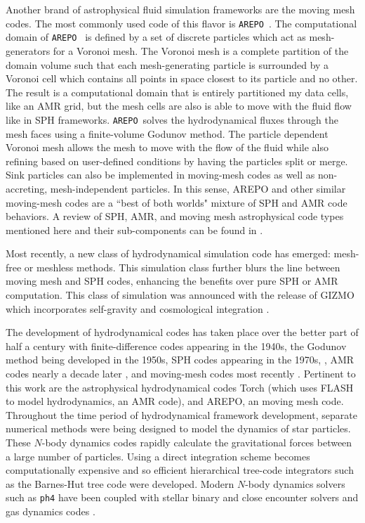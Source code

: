 \documentclass[twoside]{drexel-thesis}
\newcommand\arepo{\texttt{AREPO}}
\begin{document}
\begin{thesis}
Another brand of astrophysical fluid simulation frameworks are the moving mesh codes. The most commonly used code of this flavor is \arepo~\citep{springel_e_2010}. The computational domain of \arepo~ is defined by a set of discrete particles which act as mesh-generators for a Voronoi mesh. The Voronoi mesh is a complete partition of the domain volume such that each mesh-generating particle is surrounded by a Voronoi cell which contains all points in space closest to its particle and no other. The result is a computational domain that is entirely partitioned my data cells, like an AMR grid, but the mesh cells are also is able to move with the fluid flow like in SPH frameworks. \arepo~solves the hydrodynamical fluxes through the mesh faces using a finite-volume Godunov method. The particle dependent Voronoi mesh allows the mesh to move with the flow of the fluid while also refining based on user-defined conditions by having the particles split or merge. Sink particles can also be implemented in moving-mesh codes as well as non-accreting, mesh-independent particles. In this sense, AREPO and other similar moving-mesh codes are a ``best of both worlds" mixture of SPH and AMR code behaviors. A review of SPH, AMR, and moving mesh astrophysical code types mentioned here and their sub-components can be found in \citet{dale_modelling_2015}. 

Most recently, a new class of hydrodynamical simulation code has emerged: mesh-free or meshless methods. This simulation class further blurs the line between moving mesh and SPH codes, enhancing the benefits over pure SPH or AMR computation. This class of simulation was announced with the release of GIZMO which incorporates self-gravity and cosmological integration \citep{hopkins_new_2015}.

The development of hydrodynamical codes has taken place over the better part of half a century with finite-difference codes appearing in the 1940s, the Godunov method being developed in the 1950s, SPH codes appearing in the 1970s, \citep{lucy_numerical_1977,gingold_smoothed_1977}, AMR codes nearly a decade later \citep{berger_adaptive_1984}, and moving-mesh codes most recently \citep{springel_e_2010,hopkins_new_2015}. Pertinent to this work are the astrophysical hydrodynamical codes Torch (which uses FLASH to model hydrodynamics, an AMR code), and AREPO, an moving mesh code. Throughout the time period of hydrodynamical framework development, separate numerical methods were being designed to model the dynamics of star particles. These $N$-body dynamics codes rapidly calculate the gravitational forces between a large number of particles. Using a direct integration scheme becomes computationally expensive and so efficient hierarchical tree-code integrators such as the Barnes-Hut tree code \citep{barnes_hierarchical_1986} were developed. Modern $N$-body dynamics solvers such as \texttt{ph4} \citep{mcmillan_simulations_2012} have been coupled with stellar binary and close encounter solvers and gas dynamics codes \citep{hut_building_1995,mcmillan_binary--single-star_1996, portegies_zwart_astrophysical_2018}. 


\end{thesis}
\end{document}
